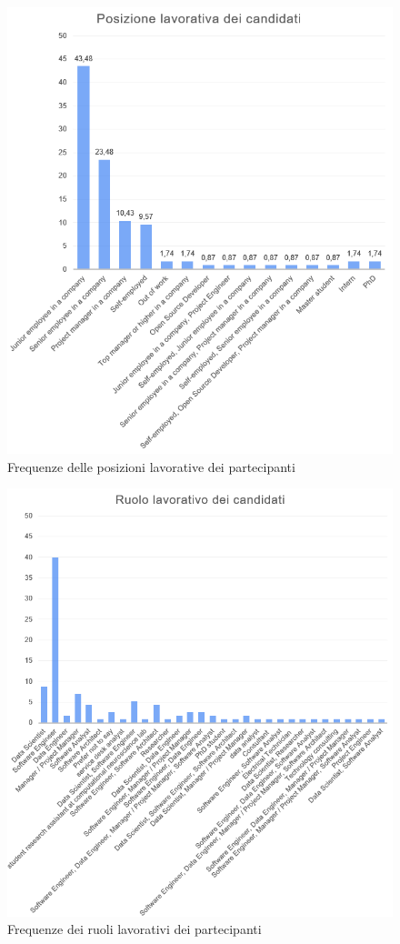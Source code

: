 \begin{figure}[h!]
    \centering
    \includegraphics[width=1\textwidth]{figure/data-analysis/lavoro2.png}
    \caption{Frequenze delle posizioni lavorative dei partecipanti}
    \label{im-a-part-6}
\end{figure}

\begin{figure}[h!]
    \centering
    \includegraphics[width=1\textwidth]{figure/data-analysis/ruoli.png}
    \caption{Frequenze dei ruoli lavorativi dei partecipanti}
    \label{im-a-part-7}
\end{figure}

